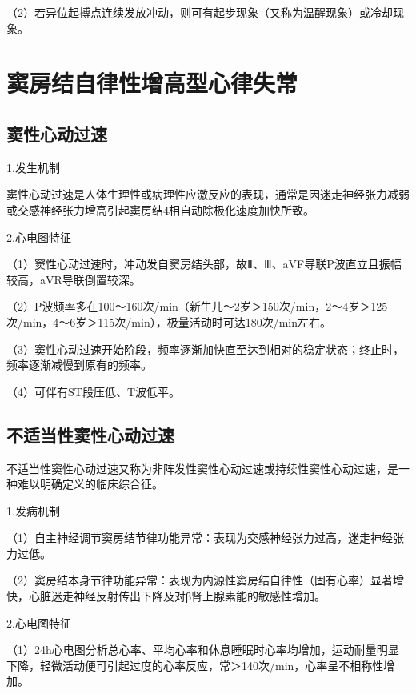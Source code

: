（2）若异位起搏点连续发放冲动，则可有起步现象（又称为温醒现象）或冷却现象。

\protect\hypertarget{text00022.htmlux5cux23subid257}{}{}

\section{窦房结自律性增高型心律失常}

\protect\hypertarget{text00022.htmlux5cux23subid258}{}{}

\subsection{窦性心动过速}

1.发生机制

窦性心动过速是人体生理性或病理性应激反应的表现，通常是因迷走神经张力减弱或交感神经张力增高引起窦房结4相自动除极化速度加快所致。

2.心电图特征

（1）窦性心动过速时，冲动发自窦房结头部，故Ⅱ、Ⅲ、aVF导联P波直立且振幅较高，aVR导联倒置较深。

（2）P波频率多在100～160次/min（新生儿～2岁＞150次/min，2～4岁＞125次/min，4～6岁＞115次/min），极量活动时可达180次/min左右。

（3）窦性心动过速开始阶段，频率逐渐加快直至达到相对的稳定状态；终止时，频率逐渐减慢到原有的频率。

（4）可伴有ST段压低、T波低平。

\protect\hypertarget{text00022.htmlux5cux23subid259}{}{}

\subsection{不适当性窦性心动过速}

不适当性窦性心动过速又称为非阵发性窦性心动过速或持续性窦性心动过速，是一种难以明确定义的临床综合征。

1.发病机制

（1）自主神经调节窦房结节律功能异常：表现为交感神经张力过高，迷走神经张力过低。

（2）窦房结本身节律功能异常：表现为内源性窦房结自律性（固有心率）显著增快，心脏迷走神经反射传出下降及对β肾上腺素能的敏感性增加。

2.心电图特征

（1）24h心电图分析总心率、平均心率和休息睡眠时心率均增加，运动耐量明显下降，轻微活动便可引起过度的心率反应，常＞140次/min，心率呈不相称性增加。

